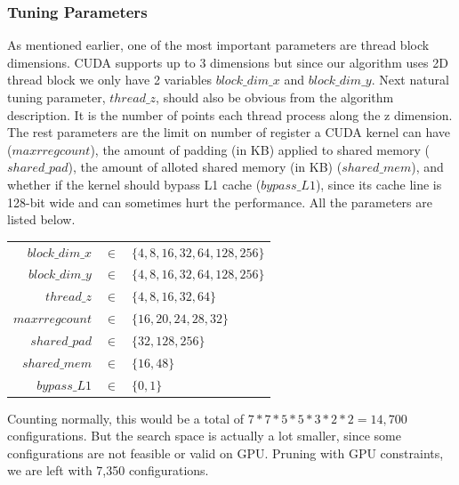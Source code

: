 \subsubsection{Tuning Parameters}
As mentioned earlier, one of the most important parameters are thread block dimensions. CUDA supports up to 3 dimensions but since our algorithm uses 2D thread block we only have 2 variables $block\_dim\_x$ and $block\_dim\_y$. Next natural tuning parameter, $thread\_z$, should also be obvious from the algorithm description. It is the number of points each thread process along the z dimension. The rest parameters are the limit on number of register a CUDA kernel can have ($maxrregcount$), the amount of padding (in KB) applied to shared memory ($shared\_pad$), the amount of alloted shared memory (in KB) ($shared\_mem$), and whether if the kernel should bypass L1 cache ($bypass\_L1$), since its cache line is 128-bit wide and can sometimes hurt the performance. All the parameters are listed below.

\begin{table}[h]
\center
\begin{tabular}{r c l}
$block\_dim\_x$ & $\in$ & $\{4, 8, 16, 32, 64, 128,256\}$	\\
$block\_dim\_y$ & $\in$ & $\{4, 8, 16, 32, 64, 128,256\}$	\\
$thread\_z$     & $\in$ & $\{4, 8, 16, 32, 64\}$			\\
$maxrregcount$  & $\in$ & $\{16, 20, 24, 28, 32\}$			\\
$shared\_pad$   & $\in$ & $\{32, 128, 256\}$				\\
$shared\_mem$   & $\in$ & $\{16, 48\}$						\\
$bypass\_L1$    & $\in$ & $\{0, 1\}$						\\
\end{tabular}
\end{table}

Counting normally, this would be a total of $7*7*5*5*3*2*2=14,700$ configurations. But the search space is actually a lot smaller, since some configurations are not feasible or valid on GPU. Pruning with GPU constraints, we are left with 7,350 configurations.

